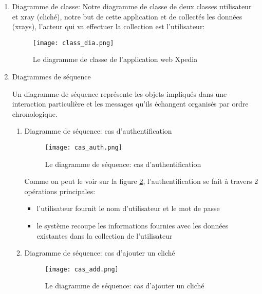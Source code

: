             \begin{enumerate}
                \item Diagramme de classe:
                Notre diagramme de classe de  deux classes utilisateur et xray (cliché), notre but de cette application et de collectés les données (xrays), l'acteur qui va effectuer la collection est l'utilisateur:
                \begin{figure}[H]
                    \centering
                    \texttt{[image: class\_dia.png]}
                    \caption{Le diagramme de classe de l'application web Xpedia}\label{fig:class_dia}
                \end{figure}

                \item Diagrammes de séquence
                
                Un diagramme de séquence représente les objets impliqués dans une interaction particulière et les messages qu'ils échangent organisés par ordre chronologique.
                \begin{enumerate}
                    \item Diagramme de séquence: cas d'authentification
                    \begin{figure}[H]
                        \centering
                        \texttt{[image: cas\_auth.png]}
                        \caption{Le diagramme de séquence: cas d'authentification}\label{fig:cas_auth}
                    \end{figure}

                    Comme on peut le voir sur la figure \ref{fig:cas_auth}, l'authentification se fait à travers 2 opérations principales:
                    \begin{itemize}[label=$\bullet$]
                        \item l'utilisateur fournit le nom d'utilisateur et le mot de passe
                        \item le système recoupe les informations fournies avec les données existantes dans la collection de l'utilisateur
                    \end{itemize}
                    \item Diagramme de séquence: cas d'ajouter un cliché
                    \begin{figure}[H]
                        \centering
                        \texttt{[image: cas\_add.png]}
                        \caption{Le diagramme de séquence: cas d'ajouter un cliché}\label{fig:cas_add}
                    \end{figure}
                \end{enumerate}
            \end{enumerate}
        
